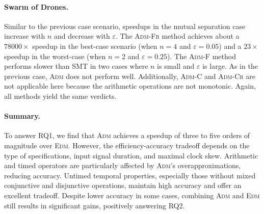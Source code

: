 \paragraph*{Swarm of Drones.}
Similar to the previous case scenario, speedups in the mutual separation case increase with \(n\) and decrease with \(\varepsilon\).
The \textsc{Adm-Fr} method achieves about a $78000\times$ speedup in the best-case scenario (when \(n=4\) and \(\varepsilon=0.05\)) and a $23\times$ speedup in the worst-case (when \(n=2\) and \(\varepsilon=0.25\)).
The \textsc{Adm-F} method performs slower than SMT in two cases where \(n\) is small and \(\varepsilon\) is large.
%
As in the previous case, \textsc{Adm} does not perform well.
Additionally, \textsc{Adm-C} and \textsc{Adm-Cr} are not applicable here because the arithmetic operations are not monotonic.
Again, all methods yield the same verdicts.

\paragraph*{Summary.}
To answer RQ1, we find that \textsc{Adm} achieves a speedup of three to five orders of magnitude over \textsc{Edm}. However, the efficiency-accuracy tradeoff depends on the type of specifications, input signal duration, and maximal clock skew. Arithmetic and timed operators are particularly affected by \textsc{Adm}'s overapproximations, reducing accuracy. Untimed temporal properties, especially those without mixed conjunctive and disjunctive operations, maintain high accuracy and offer an excellent tradeoff. Despite lower accuracy in some cases, combining \textsc{Adm} and \textsc{Edm} still results in significant gains, positively answering RQ2.

